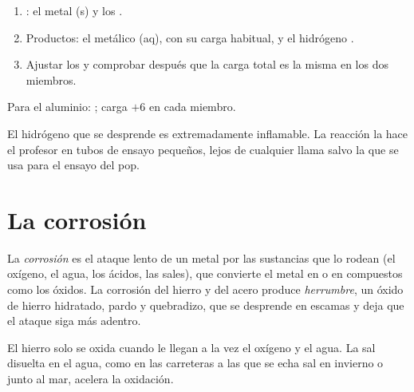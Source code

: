 \begin{method}\label{met:g9:metals-acids-corrosion:write}
\begin{enumerate}
  \item {}: el metal (s) y los  .
  \item Productos: el  metálico (aq), con su carga habitual, y el
        hidrógeno .
  \item Ajustar los  y comprobar después que la carga total es la
        misma en los dos miembros.
\end{enumerate}
Para el aluminio: ; carga
$+6$ en cada miembro.
\end{method}

\begin{safety}{}
El hidrógeno que se desprende es extremadamente inflamable. La reacción
la hace el profesor en tubos de ensayo pequeños, lejos de cualquier
llama salvo la que se usa para el ensayo del pop.
\end{safety}

\section{La corrosión}

\begin{definition}\label{def:g9:metals-acids-corrosion:corrosion}
La \emph{corrosión} es el ataque lento de un metal por
las sustancias que lo rodean (el oxígeno, el agua, los ácidos, las
sales), que convierte el metal en  o en compuestos como los
óxidos. La corrosión del hierro y del acero produce
\emph{herrumbre}, un óxido de hierro hidratado, pardo y
quebradizo, que se desprende en escamas y deja que el ataque siga más
adentro.
\end{definition}

\begin{proposition}\label{prop:g9:metals-acids-corrosion:needs}
El hierro solo se oxida cuando le llegan a la vez el oxígeno y el agua.
La sal disuelta en el agua, como en las carreteras a las que se echa
sal en invierno o junto al mar, acelera la oxidación.
\end{proposition}

